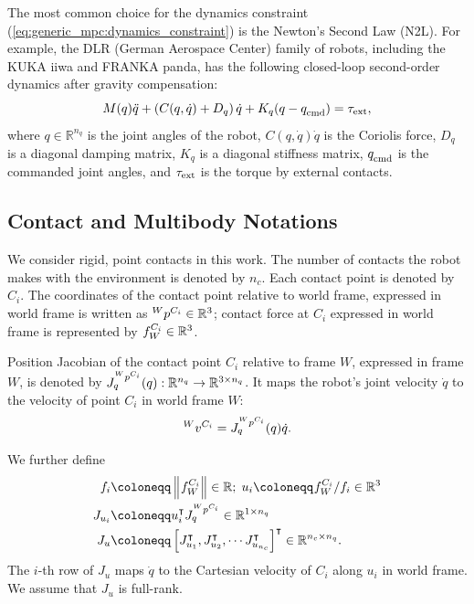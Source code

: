 The most common choice for the dynamics constraint (\ref{eq:generic_mpc:dynamics_constraint}) is the Newton's Second Law (N2L). For example, the DLR (German Aerospace Center) family of robots, including the KUKA iiwa and FRANKA panda, has the following closed-loop second-order dynamics after gravity compensation\cite{ott2008passivity}: 
\begin{equation}
\label{eq:iiwa_second_order_closed_loop_dynamics}
M(q) \ddot{q} + \left(C(q, \dot{q}) + D_q\right) \dot{q} + K_q(q - \qcmd) = \tauE,
\end{equation}
where $q \in \mathbb{R}^{n_q}$ is the joint angles of the robot, $C(q, \dot{q}) \dot{q}$ is the Coriolis force, $D_q$ is a diagonal damping matrix, $K_q$ is a diagonal stiffness matrix, $\qcmd$ is the commanded joint angles, and $\tauE$ is the torque by external contacts.

\subsection{Contact and Multibody Notations}
We consider rigid, point contacts in this work. The number of contacts the robot makes with the environment is denoted by $n_c$. Each contact point is denoted by $C_i$. The coordinates of the contact point relative to world frame, expressed in world frame is written as $\quantity{p}{W}{C_i}{} \in \mathbb{R}^3$; contact force at $C_i$ expressed in world frame is represented by $\quantity{f}{}{C_i}{W} \in \mathbb{R}^3$. 

Position Jacobian of the contact point $C_i$ relative to frame $W$, expressed in frame $W$, is denoted by $J_{q}^{\quantity{p}{W}{C_i}{}}(q) : \mathbb{R}^{n_q} \rightarrow \mathbb{R}^{3 \times n_q}$. It maps the robot's joint velocity $\Dot{q}$ to the velocity of point $C_i$ in world frame $W$:
\begin{equation}
\quantity{v}{W}{C_i}{} = J_{q}^{\quantity{p}{W}{C_i}{}}(q) \Dot{q}.
\end{equation}

We further define
\begin{subequations}
\label{eq:contact_definitions}
\begin{align}
f_i  &\coloneqq \norm{\quantity{f}{}{C_i}{W}} \in \mathbb{R};  \;  u_i \coloneqq \quantity{f}{}{C_i}{W} / f_i \in \mathbb{R}^3\\
J_{u_i} &\coloneqq u_i^{\intercal} J_{q}^{\quantity{p}{W}{C_i}{}} \in \mathbb{R}^{1 \times n_q}\\
J_u &\coloneqq \left[J_{u_1}^\intercal, J_{u_2}^\intercal, \cdots J_{u_{n_c}}^\intercal \right]^\intercal \in \mathbb{R}^{n_c \times n_q}. \label{eq:contact_jacobian}
\end{align}
\end{subequations}
The $i$-th row of $J_u$ maps $\Dot{q}$ to the Cartesian velocity of $C_i$ along $u_i$ in world frame. We assume that $J_u$ is full-rank.


